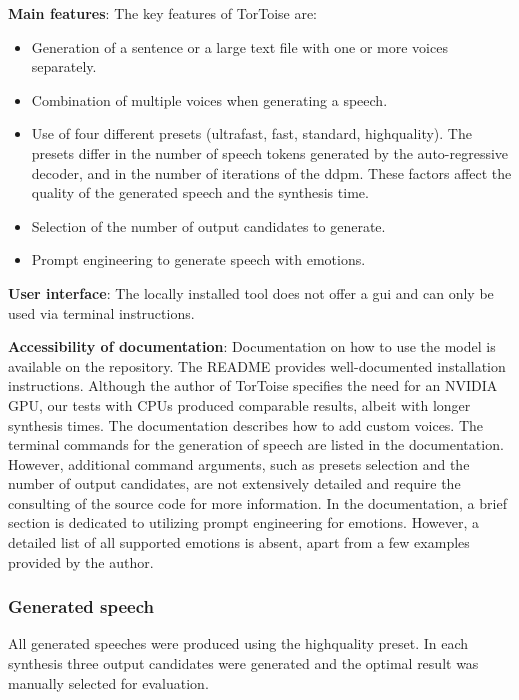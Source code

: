\textbf{Main features}: The key features of TorToise are:
\begin{itemize}
    \item Generation of a sentence or a large text file with one or more voices separately.
    \item Combination of multiple voices when generating a speech.
    \item Use of four different presets (ultra\textunderscore fast, fast, standard, high\textunderscore quality). The presets differ in the number of speech tokens generated by the auto-regressive decoder, and in the number of iterations of the \gls{ddpm}. These factors affect the quality of the generated speech and the synthesis time.
    \item Selection of the number of output candidates to generate.
    \item Prompt engineering to generate speech with emotions.
\end{itemize}

\textbf{User interface}: The locally installed tool does not offer a \gls{gui} and can only be used via terminal instructions.

\textbf{Accessibility of documentation}: Documentation on how to use the model is available on the repository\cite{betker_tortoise_2022}. The README provides well-documented installation instructions. Although the author of TorToise specifies the need for an NVIDIA GPU, our tests with CPUs produced comparable results, albeit with longer synthesis times. The documentation describes how to add custom voices. The terminal commands for the generation of speech are listed in the documentation. However, additional command arguments, such as presets selection and the number of output candidates, are not extensively detailed and require the consulting of the source code for more information. In the documentation, a brief section is dedicated to utilizing prompt engineering for emotions. However, a detailed list of all supported emotions is absent, apart from a few examples provided by the author.

\subsubsection{Generated speech}
All generated speeches were produced using the high\textunderscore quality preset. In each synthesis three output candidates were generated and the optimal result was manually selected for evaluation.

